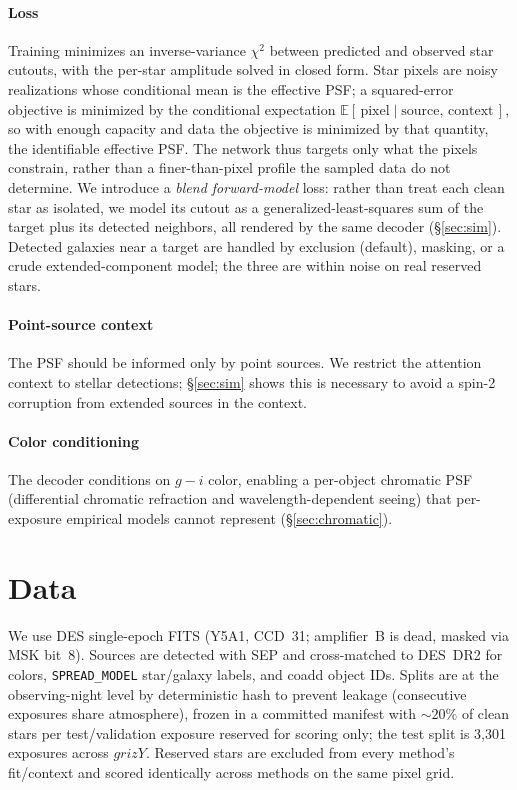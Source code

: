 \documentclass[twocolumn]{aastex701}
\begin{document}
\paragraph{Loss} Training minimizes an inverse-variance $\chi^2$ between predicted and
observed star cutouts, with the per-star amplitude solved in closed form. Star pixels are
noisy realizations whose conditional mean is the effective PSF; a squared-error objective
is minimized by the conditional expectation $\mathbb{E}[\,\text{pixel}\mid\text{source,
context}\,]$, so with enough capacity and data the objective is minimized by that
quantity, the identifiable effective PSF. The network thus targets only what the pixels
constrain, rather than a finer-than-pixel profile the sampled data do not determine. We
introduce a
\emph{blend forward-model} loss: rather than treat each clean star as isolated, we model
its cutout as a generalized-least-squares sum of the target plus its detected neighbors,
all rendered by the same decoder (\S\ref{sec:sim}). Detected galaxies near a target are
handled by exclusion (default), masking, or a crude extended-component model; the three
are within noise on real reserved stars.

\paragraph{Point-source context} The PSF should be informed only by point sources. We
restrict the attention context to stellar detections; \S\ref{sec:sim} shows this is
necessary to avoid a spin-2 corruption from extended sources in the context.

\paragraph{Color conditioning} The decoder conditions on $g{-}i$ color, enabling a
per-object chromatic PSF (differential chromatic refraction and wavelength-dependent
seeing) that per-exposure empirical models cannot represent (\S\ref{sec:chromatic}).

\section{Data} \label{sec:data}

We use DES single-epoch FITS (Y5A1, CCD~31; amplifier~B is dead, masked via MSK bit~8).
Sources are detected with \textsc{SEP} and cross-matched to DES~DR2 for colors,
\texttt{SPREAD\_MODEL} star/galaxy labels, and coadd object IDs. Splits are at the
observing-night level by deterministic hash to prevent leakage (consecutive exposures
share atmosphere), frozen in a committed manifest with ${\sim}20\%$ of clean stars per
test/validation exposure reserved for scoring only; the test split is 3{,}301 exposures
across $grizY$. Reserved stars are excluded from every method's fit/context and scored
identically across methods on the same pixel grid.
\end{document}
